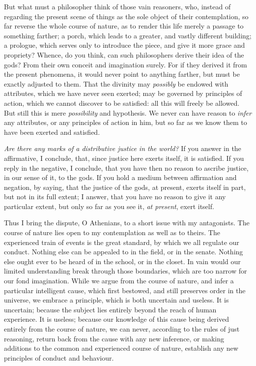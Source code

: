 \documentclass[]{article}
\begin{document}
\begin{sectionbody}
\humeparagraph  But what must a philosopher think of those vain reasoners, who, instead of regarding the present scene of things as the sole object of their contemplation, so far reverse the whole course of nature, as to render this life merely a passage to something farther; a porch, which leads to a greater, and vastly different building; a prologue, which serves only to introduce the piece, and give it more grace and propriety? Whence, do you think, can such philosophers derive their idea of the gods? From their own conceit and imagination surely. For if they derived it from the present phenomena, it would never point to anything farther, but must be exactly adjusted to them. That the divinity may \emph{possibly} be endowed with attributes, which we have never seen exerted; may be governed by principles of action, which we cannot discover to be satisfied: all this will freely be allowed. But still this is mere \emph{possibility} and hypothesis. We never can have reason to \emph{infer} any attributes, or any principles of action in him, but so far as we know them to have been exerted and satisfied.

\humeparagraph  \emph{Are there any marks of a distributive justice in the world?} If you answer in the affirmative, I conclude, that, since justice here exerts itself, it is satisfied. If you reply in the negative, I conclude, that you have then no reason to ascribe justice, in our sense of it, to the gods. If you hold a medium between affirmation and negation, by saying, that the justice of the gods, at present, exerts itself in part, but not in its full extent; I answer, that you have no reason to give it any particular extent, but only so far as you see it, \emph{at present}, exert itself.

\humeparagraph  Thus I bring the dispute, O Athenians, to a short issue with my antagonists. The course of nature lies open to my contemplation as well as to theirs. The experienced train of events is the great standard, by which we all regulate our conduct. Nothing else can be appealed to in the field, or in the senate. Nothing else ought ever to be heard of in the school, or in the closet. In vain would our limited understanding break through those boundaries, which are too narrow for our fond imagination. While we argue from the course of nature, and infer a particular intelligent cause, which first bestowed, and still preserves order in the universe, we embrace a principle, which is both uncertain and useless. It is uncertain; because the subject lies entirely beyond the reach of human experience. It is useless; because our knowledge of this cause being derived entirely from the course of nature, we can never, according to the rules of just reasoning, return back from the cause with any new inference, or making additions to the common and experienced course of nature, establish any new principles of conduct and behaviour.


\end{sectionbody}
\end{document}
